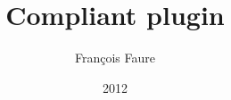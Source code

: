 \documentclass[a4paper,10pt]{article}
\title{Compliant plugin}
\author{Fran\c{c}ois Faure}
\date{2012}
\begin{document}
\maketitle

\htmlonly{ \tableofcontents }

% 


\end{document}
